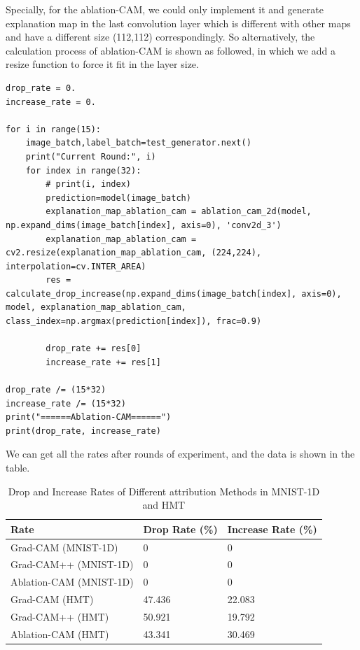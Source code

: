 \documentclass[conference]{IEEEtran}
\begin{document}
Specially, for the ablation-CAM, we could only implement it and generate explanation map in the last convolution layer which is different with other maps and have a different size (112,112) correspondingly. So alternatively, the calculation process of ablation-CAM is shown as followed, in which we add a resize function to force it fit in the layer size.

\begin{lstlisting}
drop_rate = 0.
increase_rate = 0.

for i in range(15):
    image_batch,label_batch=test_generator.next()
    print("Current Round:", i)
    for index in range(32):
        # print(i, index)
        prediction=model(image_batch)
        explanation_map_ablation_cam = ablation_cam_2d(model, np.expand_dims(image_batch[index], axis=0), 'conv2d_3')
        explanation_map_ablation_cam = cv2.resize(explanation_map_ablation_cam, (224,224), interpolation=cv.INTER_AREA)
        res = calculate_drop_increase(np.expand_dims(image_batch[index], axis=0), model, explanation_map_ablation_cam, class_index=np.argmax(prediction[index]), frac=0.9)

        drop_rate += res[0]
        increase_rate += res[1]

drop_rate /= (15*32)
increase_rate /= (15*32)
print("======Ablation-CAM======")
print(drop_rate, increase_rate)
\end{lstlisting}

We can get all the rates after rounds of experiment, and the data is shown in the table.

\begin{table}[h]
\caption{Drop and Increase Rates of Different attribution Methods in MNIST-1D and HMT}
\begin{tabular}{|l|l|l|}
\hline
Rate                    & Drop Rate (\%) & Increase Rate (\%) \\ \hline
Grad-CAM (MNIST-1D)     & 0              & 0                  \\ \hline
Grad-CAM++ (MNIST-1D)   & 0              & 0                  \\ \hline
Ablation-CAM (MNIST-1D) & 0              & 0                  \\ \hline
Grad-CAM (HMT)          & 47.436         & 22.083             \\ \hline
Grad-CAM++ (HMT)        & 50.921         & 19.792             \\ \hline
Ablation-CAM (HMT)      & 43.341         & 30.469             \\ \hline
\end{tabular}
\end{table}
\end{document}
